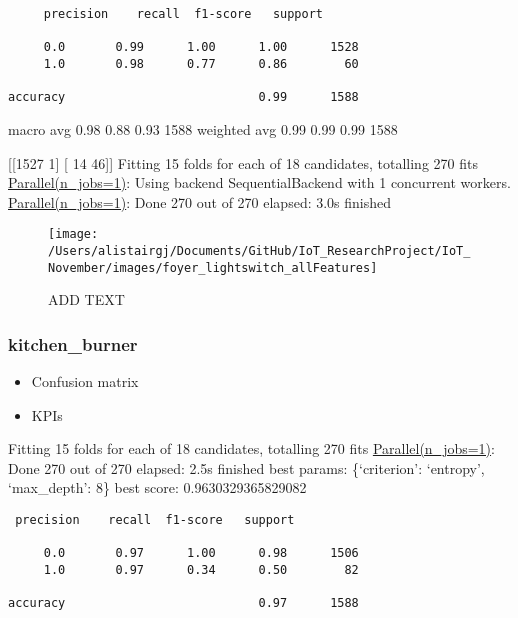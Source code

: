 \documentclass[11pt,]{article}
\providecommand{\tightlist}{%
  \setlength{\itemsep}{0pt}\setlength{\parskip}{0pt}}
\begin{document}
\begin{verbatim}
     precision    recall  f1-score   support

     0.0       0.99      1.00      1.00      1528
     1.0       0.98      0.77      0.86        60

accuracy                           0.99      1588
\end{verbatim}

macro avg 0.98 0.88 0.93 1588 weighted avg 0.99 0.99 0.99 1588

{[}{[}1527 1{]} {[} 14 46{]}{]} Fitting 15 folds for each of 18
candidates, totalling 270 fits
\href{Done\%20270\%20out\%20of\%20270\%20\%7C\%20elapsed:\%202.1s\%20finished}{Parallel(n\_jobs=1)}:
Using backend SequentialBackend with 1 concurrent workers.
\href{Done\%20270\%20out\%20of\%20270\%20\%7C\%20elapsed:\%202.1s\%20finished}{Parallel(n\_jobs=1)}:
Done 270 out of 270 \textbar{} elapsed: 3.0s finished

\begin{figure}[H]

{\centering \texttt{[image: /Users/alistairgj/Documents/GitHub/IoT\_ResearchProject/IoT\_November/images/foyer\_lightswitch\_allFeatures]} 

}

\caption{ADD TEXT}\label{fig:unnamed-chunk-9}
\end{figure}

\pagebreak

\hypertarget{kitchen_burner}{%
\subsubsection{kitchen\_burner}\label{kitchen_burner}}

\begin{itemize}
\tightlist
\item
  Confusion matrix
\item
  KPIs
\end{itemize}

Fitting 15 folds for each of 18 candidates, totalling 270 fits
\href{Done\%20270\%20out\%20of\%20270\%20\%7C\%20elapsed:\%202.1s\%20finished}{Parallel(n\_jobs=1)}:
Done 270 out of 270 \textbar{} elapsed: 2.5s finished best params:
\{`criterion': `entropy', `max\_depth': 8\} best score:
0.9630329365829082

\begin{verbatim}
 precision    recall  f1-score   support

     0.0       0.97      1.00      0.98      1506
     1.0       0.97      0.34      0.50        82

accuracy                           0.97      1588
\end{verbatim}
\end{document}
